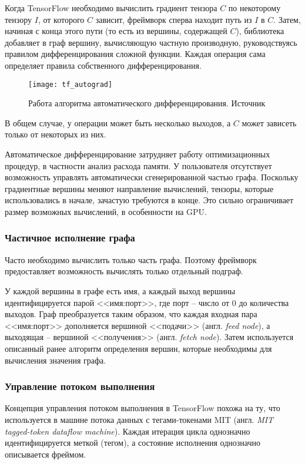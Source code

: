 Когда TensorFlow необходимо вычислить градиент тензора $C$ по некоторому
тензору $I$, от которого $C$ зависит, фреймворк сперва находит путь из
$I$ в $C$. Затем, начиная с конца этого пути (то есть из вершины, содержащей $C$),
библиотека добавляет в граф вершину, вычисляющую частную производную,
руководствуясь правилом дифференцирования сложной функции. Каждая операция сама
определяет правила собственного дифференцирования.

\begin{figure}[h]
    \centering
    \texttt{[image: tf\_autograd]}
    \caption{Работа алгоритма автоматического дифференцирования. Источник \cite{Abadi2016}}
    \label{fig:tf_autograd}
\end{figure}

В общем случае, у операции может быть несколько выходов, а $C$ может зависеть
только от некоторых из них.

Автоматическое дифференцирование затрудняет работу оптимизационных процедур,
в частности анализ расхода памяти. У пользователя отсутствует возможность
управлять автоматически сгенерированной частью графа. Поскольку градиентные
вершины меняют направление вычислений, тензоры, которые использовались в начале,
зачастую требуются в конце. Это сильно ограничивает размер возможных вычислений,
в особенности на GPU.

\subsubsection{Частичное исполнение графа}

Часто необходимо вычислить только часть графа. Поэтому фреймворк предоставляет
возможность вычислять только отдельный подграф.

У каждой вершины в графе есть имя, а каждый выход вершины идентифицируется парой
<<имя:порт>>, где порт -- число от 0 до количества выходов. Граф преобразуется
таким образом, что каждая входная пара <<имя:порт>> дополняется вершиной
<<подачи>> (англ. \textit{feed node}), а выходящая -- вершиной <<получения>>
(англ. \textit{fetch node}). Затем используется описанный ранее алгоритм
определения вершин, которые необходимы для вычисления значения графа.

\subsubsection{Управление потоком выполнения}

Концепция управления потоком выполнения в TensorFlow похожа на ту, что
используется в машине потока данных с тегами-токенами MIT (англ.
\textit{MIT tagged-token dataflow machine})\cite{Arvind1987}.
Каждая итерация цикла однозначно идентифицируется меткой (тегом), а состояние
исполнения однозначно описывается фреймом.

